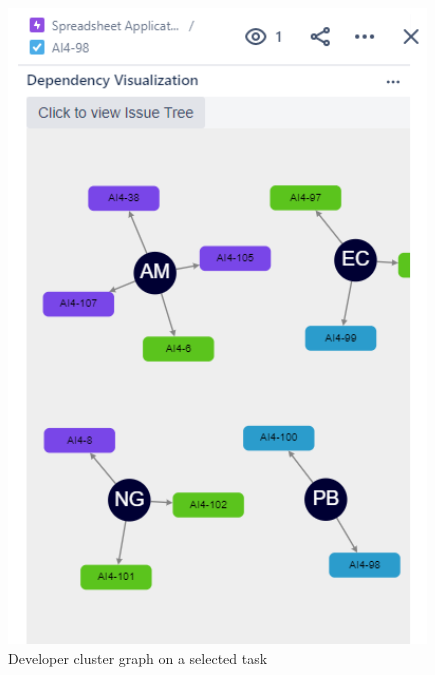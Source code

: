 \begin{figure}
\centerline{\includegraphics[width=\textwidth,height=\textheight,keepaspectratio]{./figure/Scenario2Figure2.png}}
\caption{Developer cluster graph on a selected task}
\end{figure}

\subsection{}